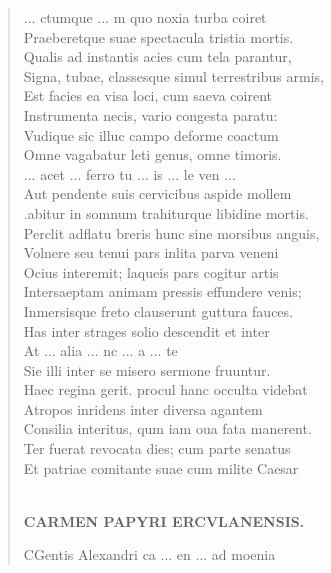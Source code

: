 \documentclass[11pt, a4paper]{report}
\begin{document}
\begin{verse}
                     \lbrack ... \rbrack  ctumque  \lbrack ... \rbrack  m quo noxia turba coiret \\ Praeberetque suae spectacula tristia mortis. \\ Qualis ad instantis acies cum tela parantur, \\ Signa, tubae, classesque simul terrestribus armis, \\ Est facies ea visa loci, cum saeva coirent \\ Instrumenta necis, vario congesta paratu: \\ Vudique sic illuc campo deforme coactum \\ Omne vagabatur leti genus, omne timoris. \\ 
                     \lbrack ... \rbrack  acet  \lbrack ... \rbrack  ferro tu  \lbrack ... \rbrack  is
                         \lbrack ... \rbrack  le ven  \lbrack ... \rbrack 
                 \\ Aut pendente suis cervicibus aspide mollem \\ .abitur in somnum trahiturque libidine mortis. \\ Perclit adflatu breris hunc sine morsibus anguis, \\ Volnere seu tenui pars inlita parva veneni \\ Ocius interemit; laqueis pars cogitur artis \\ Intersaeptam animam pressis effundere venis; \\ Inmersisque freto clauserunt guttura fauces. \\ Has inter strages solio descendit et inter \\ At  \lbrack ... \rbrack  alia  \lbrack ... \rbrack  nc  \lbrack ... \rbrack  a  \lbrack ... \rbrack  te \\ Sie illi inter se misero sermone fruuntur. \\ Haec regina gerit. procul hanc occulta videbat \\ Atropos inridens inter diversa agantem \\ Consilia interitus, qum iam oua fata manerent. \\ Ter fuerat revocata dies; cum parte senatus \\ Et patriae comitante suae cum milite Caesar \\ 
        ﻿\pagebreak 
    \begin{center} \textbf{CARMEN PAPYRI ERCVLANENSIS.} \end{center}CGentis Alexandri ca  \lbrack ... \rbrack  en  \lbrack ... \rbrack  ad moenia

\end{verse}
\end{document}
